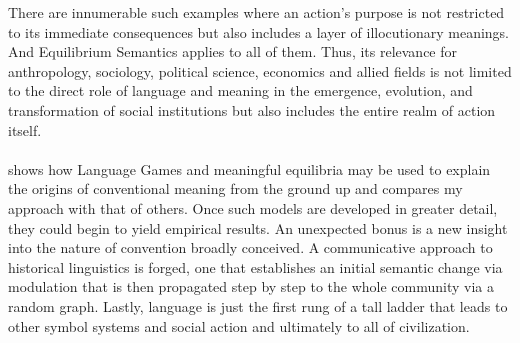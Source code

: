 There are innumerable such examples where an action's purpose is not restricted to its immediate consequences but also includes a layer of illocutionary meanings. And Equilibrium Semantics applies to all of them. Thus, its relevance for anthropology, sociology, political science, economics and allied fields is not limited to the direct role of language and meaning in the emergence, evolution, and transformation of social institutions but also includes the entire realm of action itself.\\\\
 shows how Language Games and meaningful equilibria may be used to explain the origins of conventional meaning from the ground up and compares my approach with that of others. Once such models are developed in greater detail, they could begin to yield empirical results. An unexpected bonus is a new insight into the nature of convention broadly conceived. A communicative approach to historical linguistics is forged, one that establishes an initial semantic change via modulation that is then propagated step by step to the whole community via a random graph. Lastly, language is just the first rung of a tall ladder that leads to other symbol systems and social action and ultimately to all of civilization. 

















